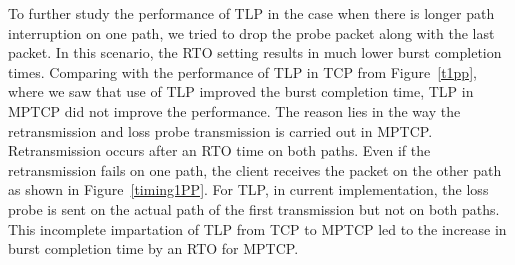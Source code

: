 \documentclass[10pt,conference,compsoc]{IEEEtran}
\begin{document}
To further study the performance of TLP in the case when there is longer path interruption on one path, we tried to drop the probe packet along with the last packet. In this scenario, the RTO
setting results in much lower burst completion times. Comparing with the performance of TLP in TCP from Figure~\ref{t1pp}, where we saw that use of TLP improved the burst completion time, TLP in MPTCP did not improve the performance. The reason lies in the way the retransmission and loss probe transmission is carried out in MPTCP. Retransmission occurs after an RTO time on both paths.
Even if the retransmission fails on one path, the client receives the packet on the other path as shown in Figure~\ref{timing1PP}. For TLP, in
current implementation, the loss probe is sent on the actual path of the first transmission but not on both paths. This incomplete impartation of
TLP from TCP to MPTCP led to the increase in burst completion time by an RTO for MPTCP. 











\end{document}
